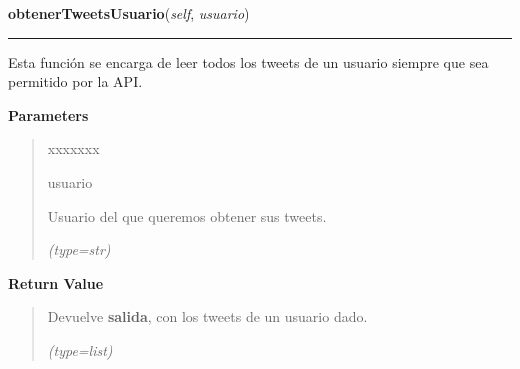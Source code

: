     \label{funcionesTwitter:FuncionesTwitter:obtenerTweetsUsuario}

    \vspace{0.5ex}

\hspace{.8\funcindent}\begin{boxedminipage}{\funcwidth}

    \raggedright \textbf{obtenerTweetsUsuario}(\textit{self}, \textit{usuario})

    \vspace{-1.5ex}

    \rule{\textwidth}{0.5\fboxrule}
\setlength{\parskip}{2ex}
    Esta función se encarga de leer todos los tweets de un usuario siempre 
    que sea permitido por la API.

\setlength{\parskip}{1ex}
      \textbf{Parameters}
      \vspace{-1ex}

      \begin{quote}
        \begin{Ventry}{xxxxxxx}

          \item[usuario]

          Usuario del que queremos obtener sus tweets.

            {\it (type=str)}

        \end{Ventry}

      \end{quote}

      \textbf{Return Value}
    \vspace{-1ex}

      \begin{quote}
      Devuelve \textbf{salida}, con los tweets de un usuario dado.

      {\it (type=list)}

      \end{quote}

    \end{boxedminipage}

